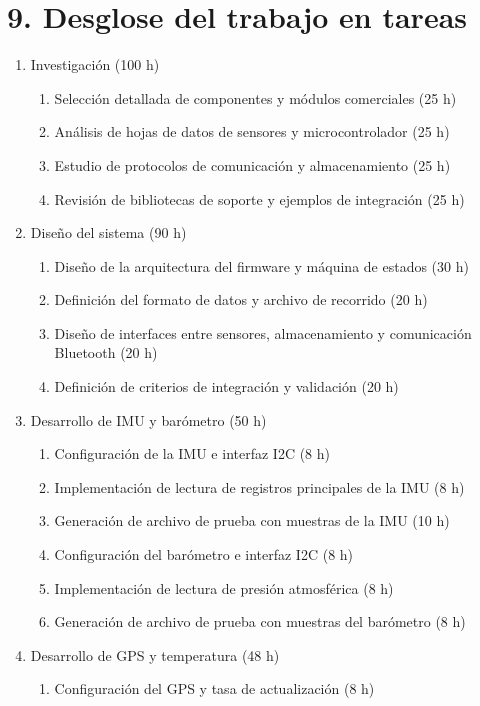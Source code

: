 \documentclass[
11pt, %
]{charter}
\begin{document}
\section{9. Desglose del trabajo en tareas}
\label{sec:wbs}

\begin{enumerate}
	\item Investigación (100 h)
	\begin{enumerate}
		\item Selección detallada de componentes y módulos comerciales (25 h)
		\item Análisis de hojas de datos de sensores y microcontrolador (25 h)
		\item Estudio de protocolos de comunicación y almacenamiento (25 h)
		\item Revisión de bibliotecas de soporte y ejemplos de integración (25 h)
	\end{enumerate}
	\item Diseño del sistema (90 h)
	\begin{enumerate}
		\item Diseño de la arquitectura del firmware y máquina de estados (30 h)
		\item Definición del formato de datos y archivo de recorrido (20 h)
		\item Diseño de interfaces entre sensores, almacenamiento y comunicación Bluetooth (20 h)
		\item Definición de criterios de integración y validación (20 h)
	\end{enumerate}
	\item Desarrollo de IMU y barómetro (50 h)
	\begin{enumerate}
		\item Configuración de la IMU e interfaz I2C (8 h)
		\item Implementación de lectura de registros principales de la IMU (8 h)
		\item Generación de archivo de prueba con muestras de la IMU (10 h)
		\item Configuración del barómetro e interfaz I2C (8 h)
		\item Implementación de lectura de presión atmosférica (8 h)
		\item Generación de archivo de prueba con muestras del barómetro (8 h)
	\end{enumerate}
	\item Desarrollo de GPS y temperatura (48 h)
	\begin{enumerate}
		\item Configuración del GPS y tasa de actualización (8 h)

\end{enumerate}
\end{enumerate}
\end{document}
